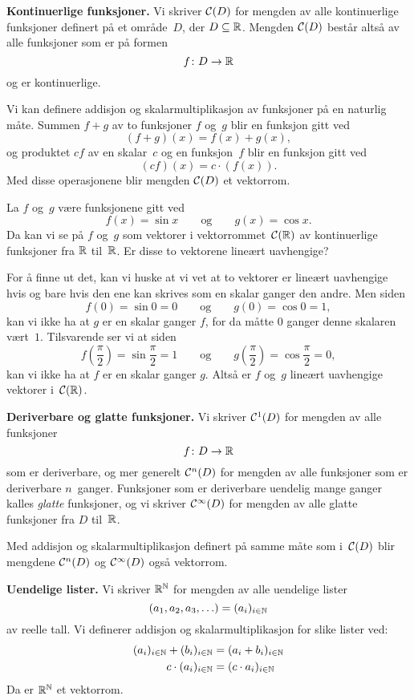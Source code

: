 \medskip\noindent\textbf{Kontinuerlige funksjoner. }%
Vi skriver $\mathcal{C}(D)$ for mengden av alle kontinuerlige funksjoner
definert på et område~$D$, der $D \subseteq \mathbb{R}$.  Mengden $\mathcal{C}(D)$
består altså av alle funksjoner som er på formen
\[
f \colon D \to \mathbb{R}
\]
og er kontinuerlige.

Vi kan definere addisjon og skalarmultiplikasjon av funksjoner på en
naturlig måte.  Summen $f + g$ av to funksjoner $f$ og~$g$ blir en
funksjon gitt ved
\[
(f + g)(x) = f(x) + g(x),
\]
og produktet $cf$ av en skalar~$c$ og en funksjon~$f$ blir en funksjon
gitt ved
\[
(cf)(x) = c \cdot (f(x)).
\]
Med disse operasjonene blir mengden $\mathcal{C}(D)$ et vektorrom.

\begin{ex}
\label{ex:sin-cos-lin-uavh}
La $f$ og~$g$ være funksjonene gitt ved
\[
f(x) = \sin x
\qquad\text{og}\qquad
g(x) = \cos x.
\]
Da kan vi se på $f$ og~$g$ som vektorer i vektorrommet~$\mathcal{C}(\mathbb{R})$ av
kontinuerlige funksjoner fra $\mathbb{R}$ til~$\mathbb{R}$.  Er disse to vektorene
lineært uavhengige?

For å finne ut det, kan vi huske at vi vet at to vektorer er lineært
uavhengige hvis og bare hvis den ene kan skrives som en skalar ganger
den andre.  Men siden
\[
f(0) = \sin 0 = 0
\qquad\text{og}\qquad
g(0) = \cos 0 = 1,
\]
kan vi ikke ha at $g$ er en skalar ganger $f$, for da måtte $0$ ganger
denne skalaren vært~$1$.  Tilsvarende ser vi at siden
\[
f\left(\frac{\pi}{2}\right) = \sin \frac{\pi}{2} = 1
\qquad\text{og}\qquad
g\left(\frac{\pi}{2}\right) = \cos \frac{\pi}{2} = 0,
\]
kan vi ikke ha at $f$ er en skalar ganger $g$.  Altså er $f$ og~$g$
lineært uavhengige vektorer i~$\mathcal{C}(\mathbb{R})$.
\end{ex}

\medskip\noindent\textbf{Deriverbare og glatte funksjoner. }%
Vi skriver $\mathcal{C}^1(D)$ for mengden av alle funksjoner
\[
f \colon D \to \mathbb{R}
\]
som er deriverbare, og mer generelt $\mathcal{C}^n(D)$ for mengden av alle
funksjoner som er deriverbare $n$~ganger.  Funksjoner som er
deriverbare uendelig mange ganger kalles \emph{glatte} funksjoner, og
vi skriver $\mathcal{C}^\infty(D)$ for mengden av alle glatte funksjoner fra
$D$ til~$\mathbb{R}$.

Med addisjon og skalarmultiplikasjon definert på samme måte som
i~$\mathcal{C}(D)$ blir mengdene $\mathcal{C}^n(D)$ og $\mathcal{C}^\infty(D)$ også vektorrom.

\medskip\noindent\textbf{Uendelige lister. }%
Vi skriver $\mathbb{R}^{\mathbb{N}}$ for mengden av alle uendelige lister
\[
(a_1, a_2, a_3, \ldots) = (a_i)_{i \in \mathbb{N}}
\]
av reelle tall.  Vi definerer addisjon og skalarmultiplikasjon for
slike lister ved:
\begin{align*}
(a_i)_{i \in \mathbb{N}} + (b_i)_{i \in \mathbb{N}} &= (a_i + b_i)_{i \in \mathbb{N}} \\
c \cdot (a_i)_{i \in \mathbb{N}} &= (c \cdot a_i)_{i \in \mathbb{N}}
\end{align*}
Da er $\mathbb{R}^{\mathbb{N}}$ et vektorrom.

